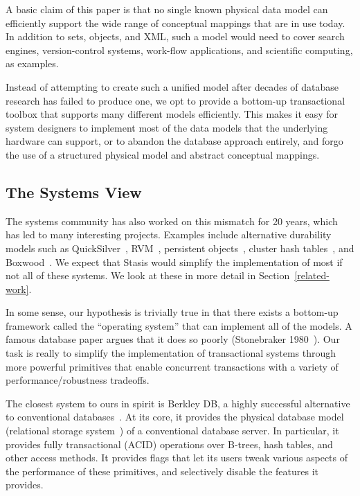 \documentclass[letterpaper,twocolumn,10pt]{article}
\newcommand{\yad}{Stasis\xspace}
\begin{document}
A basic claim of
this paper is that no single known physical data model can efficiently
support the wide range of conceptual mappings that are in use today.
In addition to sets, objects, and XML, such a model would need
to cover search engines, version-control systems, work-flow
applications, and scientific computing, as examples.

Instead of attempting to create such a unified model after decades of
database research has failed to produce one, we opt to provide a
bottom-up transactional toolbox that supports many different models
efficiently.  This makes it easy for system designers to
implement most of the data models that the underlying hardware can
support, or to abandon the database approach entirely, and forgo the
use of a structured physical model and abstract conceptual mappings.

\subsection{The Systems View}
\label{sec:systems}
The systems community has also worked on this mismatch for 20 years,
which has led to many interesting projects.  Examples include
alternative durability models such as QuickSilver~\cite{experienceWithQuickSilver},
RVM~\cite{lrvm}, persistent objects~\cite{argus}, 
cluster hash tables~\cite{DDS}, and Boxwood~\cite{boxwood}.  We expect that \yad would simplify
the implementation of most if not all of these systems.  We look at
these in more detail in Section~\ref{related-work}.

In some sense, our hypothesis is trivially true in that there exists a
bottom-up framework called the ``operating system'' that can implement
all of the models. A famous database paper argues that it does so
poorly (Stonebraker 1980~\cite{Stonebraker80}). Our task is really to
simplify the implementation of transactional systems through more
powerful primitives that enable concurrent transactions with a variety
of performance/robustness tradeoffs.

The closest system to ours in spirit is Berkley DB,  a highly successful alternative to conventional
databases~\cite{libtp}.  At its core, it provides the physical database model
(relational storage system~\cite{systemR}) of a conventional database server.
In particular, 
it provides fully transactional (ACID) operations over B-trees, 
hash tables, and other access methods.  It provides flags that 
let its users tweak various aspects of the performance of these
primitives, and selectively disable the features it provides.
\end{document}
